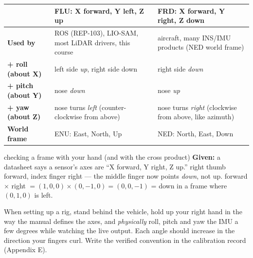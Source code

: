 
\begin{center}\small
\renewcommand{\arraystretch}{1.25}
\begin{tabularx}{\linewidth}{>{\bfseries}p{2.2cm}XX}\toprule
 & FLU: X forward, Y left, Z up & FRD: X forward, Y right, Z down\\\midrule
Used by & ROS (REP-103), LIO-SAM, most LiDAR drivers, this course & aircraft, many INS/IMU products (NED world frame)\\
+ roll (about X) & left side \emph{up}, right side down & right side \emph{down}\\
+ pitch (about Y) & nose \emph{down} & nose \emph{up}\\
+ yaw (about Z) & nose turns \emph{left} (counter-clockwise from above) & nose turns \emph{right} (clockwise from above, like azimuth)\\
World frame & ENU: East, North, Up & NED: North, East, Down\\\bottomrule
\end{tabularx}\end{center}

\begin{worked}{checking a frame with your hand (and with the cross product)}
\textbf{Given:} a datasheet says a sensor's axes are ``X forward, Y right, Z up.''
 right thumb forward, index finger right --- the middle finger now points \emph{down}, not up.
 forward $\times$ right $=(1,0,0)\times(0,-1,0)=(0,0,-1)$ = down in a frame where $(0,1,0)$ is left.
\end{worked}

\begin{tip}
When setting up a rig, stand behind the vehicle, hold up your right hand in the way the manual defines the axes, and \emph{physically} roll, pitch and yaw the IMU a few degrees while watching the live output. Each angle should increase in the direction your fingers curl. Write the verified convention in the calibration record (Appendix E).
\end{tip}


